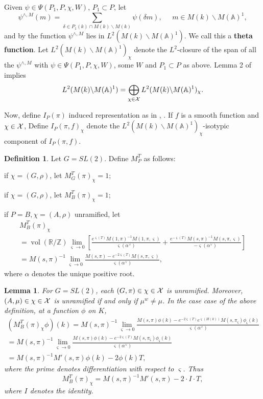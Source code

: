 \documentclass[12pt,letterpaper]{book}
\theoremstyle{plain}
\newtheorem{lemma}[theorem]{Lemma}
\theoremstyle{definition}
\newtheorem{definition}[theorem]{Definition}
\theoremstyle{remark}
\theoremstyle{remark}
\begin{document}
Given $\psi \in \Psi (P_1,P,\chi,W )$, $P_1\subset P$, let
\[
\psi ^{\wedge ,M}(m)=
\sum_{\delta \in P_1(k)\cap M(k)\backslash
M(k)}\psi (\delta m),\;\;\;\;\;m\in M(k)\backslash
M({\mathbb{A}})^1,
\]
and by \cite[Lemma 1]{L1} the function $\psi ^{\wedge ,M}$ lies in
$L^2(M(k)\backslash M({\mathbb{A}})^1)$. We call this a {\bf theta function}.
Let $L^2(M(k)\backslash M({\mathbb{A}})^1)_\chi $ denote
the $L^2$-closure of the span of all the $\psi ^{\wedge ,M}$ with $\psi \in
\Psi (P_1,P,\chi,W )$, some $W$ and $P_1\subset P$ as above.
Lemma 2 of \cite{L1} implies
\begin{equation}
L^2(M(k)\backslash M({\mathbb{A}})^1)=\bigoplus_{\chi \in
{\cal X}}L^2(M(k)\backslash M({\mathbb{A}})^1)_\chi .
\end{equation}

Now, define $I_P(\pi)$ induced representation as in \cite{A2},
\cite{A3}. If $f$ is a smooth function and $\chi\in {\cal X}$,
Define $I_P(\pi,f)_\chi$ denote the
$L^2(M(k)\backslash M({\mathbb{A}})^1)_\chi$-isotypic component
of $I_P(\pi,f)$.

\begin{definition}
Let $G=SL(2)$. Define $M^T_P$ as follows:

if $\chi =(G,\rho )$, let $M_G^T(\pi )_\chi =1$;

if $\chi =(G,\rho )$, let $M_B^T(\pi )_\chi =1$;

if $P=B,\chi =(A,\rho )$ unramified, let
\[
\begin{array}{c}
M_B^T(\pi )_\chi \\
=\operatorname{vol}({\mathbb{R}}/{\mathbb{Z}})
\lim_{\varsigma \rightarrow 0}
\left[
\frac{e^{\varsigma (T)}
M(1,\pi )^{-1}M(1,\pi ,\varsigma )}{\varsigma (\alpha^{\vee })}
+\frac{e^{-\varsigma (T)}
M(s,\pi )^{-1}M(s,\pi ,\varsigma )}{-\varsigma (\alpha^{\vee })}
\right]\\
=M(s,\pi)^{-1}
\lim_{\varsigma \rightarrow 0}
{\frac{M(s,\pi)-e^{-2\varsigma (T)}M(s,\pi,\varsigma)}{\varsigma(\alpha^\vee)}} ,
\end{array}
\]
where $\alpha $ denotes the unique positive root.
\end{definition}

\begin{lemma}
For $G=SL(2)$, each $(G,\pi)\in\chi\in{\cal{X}}$ is
unramified. Moreover, $(A,\mu)\in\chi\in{\cal{X}}$ is unramified
if and only if $\mu^w\not=\mu$.
In the case case of the above definition, at a function $\phi$ on $K$,
\[
\begin{array}{c}
(M^T_B(\pi)_\chi \phi)(k)=
M(s,\pi)^{-1}
\lim_{\varsigma \rightarrow 0}
{\frac{M(s,\pi)\phi(k)-e^{-2\varsigma (T)}e^{\varsigma (H(k))}
M(s,\pi_\varsigma)\phi_\varsigma(k)}{\varsigma(\alpha^\vee)}} \\
=M(s,\pi)^{-1}
\lim_{\varsigma \rightarrow 0}
{\frac{M(s,\pi)\phi(k)-e^{-2\varsigma (T)}M(s,\pi_\varsigma)\phi_\varsigma (k)}{\varsigma(\alpha^\vee)}} \\
=M(s,\pi)^{-1}M'(s,\pi)\phi(k)-2 \phi(k) T,
\end{array}
\]
where the prime denotes differentiation with respect to
$\varsigma$. Thus
\[
M_B^T(\pi )_\chi =
M(s,\pi)^{-1}M'(s,\pi)-2\cdot I\cdot T,
\]
where $I$ denotes the identity.
\end{lemma}
\end{document}
